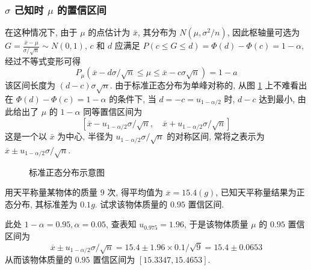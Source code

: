 \subsubsection{$\sigma$ 己知时 $\mu$ 的置信区间}\label{sssec:6.5.3.1}
在这种情况下, 由于 $\mu$ 的点估计为 $\bar x$, 其分布为 $N\left(\mu, \sigma^{2} / n\right)$, 因此枢轴量可选为 $G=\frac{\overline{x}-\mu}{\sigma / \sqrt{n}} \sim N(0,1)$, $c$ 和 $d$ 应满足 $P(c \leqslant G \leqslant d)=\Phi(d)-\Phi(c)=1-\alpha$, 经过不等式变形可得
\[P_{\mu}(\overline{x}-d \sigma / \sqrt{n} \leqslant \mu \leqslant \overline{x}-c\sigma\sqrt{n})=1-a\]
该区间长度为 $(d-c) \sigma \sqrt{n}$. 由于标准正态分布为单峰对称的, 从图 \ref{fig:6.5.3} 上不难看出在 $\Phi(d)-\Phi(c)=1-\alpha$ 的条件下, 当 $d=-c=u_{1-\alpha/ 2}$ 时, $d-c$ 达到最小, 由此给出了 $\mu$ 的 $1-\alpha$ 同等置信区间为
\begin{equation}\label{eq:6.5.8}
\left[\overline{x}-u_{1-\alpha / 2} \sigma / \sqrt{n}, \quad \overline{x}+u_{1-\alpha / 2} \sigma / \sqrt{n}\right]
\end{equation}
这是一个以 $\bar x$ 为中心, 半径为 $u_{1-\alpha / 2} \sigma / \sqrt{n}$ 的对称区间, 常将之表示为 $\overline{x} \pm u_{1-\alpha / 2} \sigma / \sqrt{n}$.
\begin{figure}[htbp]
\centering
{}
\caption{标准正态分布示意图}
\label{fig:6.5.3}	
\end{figure}

\begin{example}\label{exam:6.5.3}
用天平称量某物体的质量 $9$ 次, 得平均值为 $\overline{x}=15.4(g)$, 已知天平称量结果为正态分布, 其标准差为 $0.1g$. 试求该物体质量的 $0.95$ 置信区间.
\end{example}\begin{solution}
此处 $1-\alpha=0.95, \alpha=0.05$, 查表知 $u_{0.975}=1.96$, 于是该物体质量 $\mu$ 的 $0.95$ 置信区间为
\[\overline{x} \pm u_{1-\alpha/ 2} \sigma / \sqrt{n}=15.4 \pm 1.96 \times 0.1 / \sqrt{9}=15.4 \pm 0.0653\]
从而该物体质量的 $0.95$ 置信区间为 $[15.3347,15.4653]$.
\end{solution}

